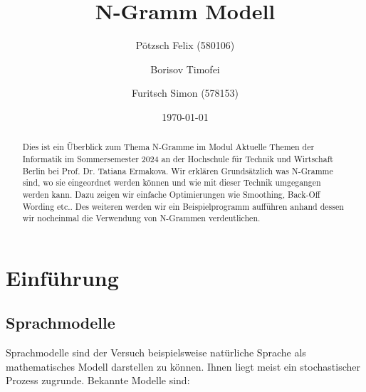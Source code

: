 \documentclass[12pt]{article}
\title{N-Gramm Modell}
\author{
  Pötzsch Felix (580106)\\
  \and
  Borisov Timofei \\
  \and
  Furitsch Simon (578153)\\
}
\date{\today}
\begin{document}
\maketitle

\begin{abstract}
	Dies ist ein Überblick zum Thema N-Gramme im Modul 
	Aktuelle Themen der Informatik im Sommersemester 2024 an der 
	Hochschule für Technik und Wirtschaft Berlin bei Prof. Dr. Tatiana Ermakova.
	Wir erklären Grundsätzlich was N-Gramme sind, wo sie eingeordnet werden können und wie mit dieser Technik umgegangen werden kann. 
	Dazu zeigen wir einfache Optimierungen wie Smoothing, Back-Off Wording etc.. 
	Des weiteren werden wir ein Beispielprogramm aufführen anhand dessen wir nocheinmal 
	die Verwendung von N-Grammen verdeutlichen.
\end{abstract}

\tableofcontents
\clearpage

\section{Einführung}

\subsection{Sprachmodelle}
Sprachmodelle sind der Versuch beispielsweise natürliche Sprache als mathematisches 
Modell darstellen zu können. Ihnen liegt meist ein stochastischer Prozess zugrunde. 
Bekannte Modelle sind:
\end{document}
